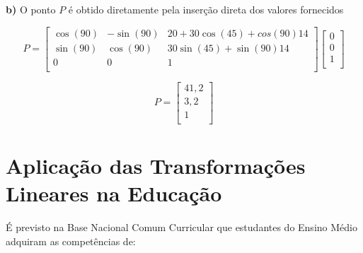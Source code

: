 \noindent\textbf{b)} O ponto $P$ é obtido diretamente pela inserção direta dos valores fornecidos

\[
	P = \begin{bmatrix}
		\cos(90) & -\sin(90) & 20 + 30\cos(45)+ cos(90)14 \\
		\sin(90) & \cos(90)  & 30\sin(45) + \sin(90)14    \\
		0        & 0         & 1                          \\
	\end{bmatrix}
	\begin{bmatrix}
		0 \\
		0 \\
		1 \\
	\end{bmatrix}
\]

\[
	P = \begin{bmatrix}
		41,2 \\
		3,2  \\
		1    \\
	\end{bmatrix}
\]

\section{Aplicação das Transformações Lineares na Educação}
É previsto na Base Nacional Comum Curricular \cite{brasil_bncc2018} que estudantes do Ensino Médio adquiram as competências de:

